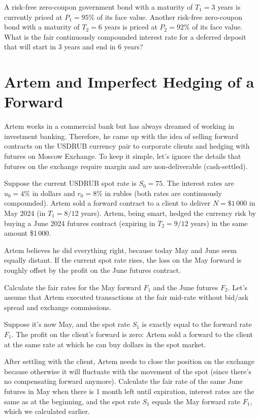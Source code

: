 \documentclass[a4paper,14pt]{extarticle}
\begin{document}
A risk-free zero-coupon government bond with a maturity of $T_1=3$ years is currently priced at $P_1=95\%$ of its face value. Another risk-free zero-coupon bond with a maturity of $T_2=6$ years is priced at $P_2=92\%$ of its face value. What is the fair continuously compounded interest rate for a deferred deposit that will start in 3 years and end in 6 years?

\section{Artem and Imperfect Hedging of a Forward}

Artem works in a commercial bank but has always dreamed of working in investment banking. Therefore, he came up with the idea of selling forward contracts on the USDRUB currency pair to corporate clients and hedging with futures on Moscow Exchange. To keep it simple, let's ignore the details that futures on the exchange require margin and are non-deliverable (cash-settled).

Suppose the current USDRUB spot rate is $S_0=75$. The interest rates are $u_0=4\%$ in dollars and $r_0=8\%$ in rubles (both rates are continuously compounded). Artem sold a forward contract to a client to deliver $N=\$1\,000$ in May 2024 (in $T_1 = 8/12$ years). Artem, being smart, hedged the currency risk by buying a June 2024 futures contract (expiring in $T_2 = 9/12$ years) in the same amount \$1\,000.

Artem believes he did everything right, because today May and June seem equally distant. If the current spot rate rises, the loss on the May forward is roughly offset by the profit on the June futures contract.

Calculate the fair rates for the May forward $F_1$ and the June futures $F_2$. Let's assume that Artem executed transactions at the fair mid-rate without bid/ask spread and exchange commissions.

Suppose it's now May, and the spot rate $S_1$ is exactly equal to the forward rate $F_1$. The profit on the client's forward is zero: Artem sold a forward to the client at the same rate at which he can buy dollars in the spot market.

After settling with the client, Artem needs to close the position on the exchange because otherwise it will fluctuate with the movement of the spot (since there's no compensating forward anymore). Calculate the fair rate of the same June futures in May when there is 1 month left until expiration, interest rates are the same as at the beginning, and the spot rate $S_1$ equals the May forward rate $F_1$, which we calculated earlier.
\end{document}
